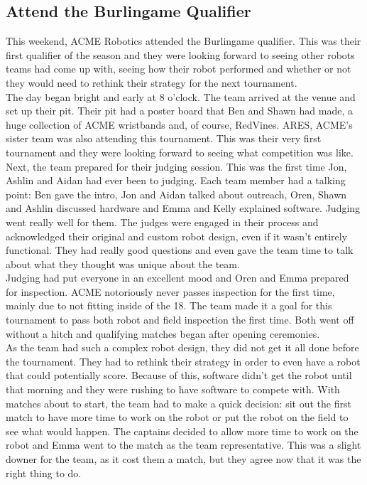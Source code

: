 \documentclass{article}
\begin{document}
\subsection{Attend the Burlingame Qualifier}
This weekend, ACME Robotics attended the Burlingame qualifier. This was their first qualifier of the season and they were looking forward to seeing other robots teams had come up with, seeing how their robot performed and whether or not they would need to rethink their strategy for the next tournament.\\

The day began bright and early at 8 o'clock. The team arrived at the venue and set up their pit. Their pit had a poster board that Ben and Shawn had made, a huge collection of ACME wristbands and, of course, RedVines. ARES, ACME's sister team was also attending this tournament. This was their very first tournament and they were looking forward to seeing what competition was like. \\

Next, the team prepared for their judging session. This was the first time Jon, Ashlin and Aidan had ever been to judging. Each team member had a talking point: Ben gave the intro, Jon and Aidan talked about outreach, Oren, Shawn and Ashlin discussed hardware and Emma and Kelly explained software. Judging went really well for them. The judges were engaged in their process and acknowledged their original and custom robot design, even if it wasn't entirely functional. They had really good questions and even gave the team time to talk about what they thought was unique about the team. \\

Judging had put everyone in an excellent mood and Oren and Emma prepared for inspection. ACME notoriously never passes inspection for the first time, mainly due to not fitting inside of the 18. The team made it a goal for this tournament to pass both robot and field inspection the first time. Both went off without a hitch and qualifying matches began after opening ceremonies. \\

As the team had such a complex robot design, they did not get it all done before the tournament. They had to rethink their strategy in order to even have a robot that could potentially score. Because of this, software didn't get the robot until that morning and they were rushing to have software to compete with. With matches about to start, the team had to make a quick decision: sit out the first match to have more time to work on the robot or put the robot on the field to see what would happen. The captains decided to allow more time to work on the robot and Emma went to the match as the team representative. This was a slight downer for the team, as it cost them a match, but they agree now that it was the right thing to do. \\
\end{document}

